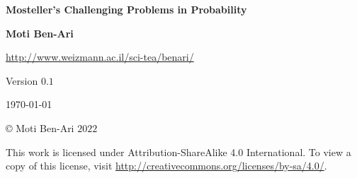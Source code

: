 

\thispagestyle{empty}

\begin{center}
\textbf{\LARGE Mosteller's Challenging Problems in Probability}

\bigskip
\bigskip
\bigskip

\textbf{\Large Moti Ben-Ari}

\bigskip

\url{http://www.weizmann.ac.il/sci-tea/benari/}

\bigskip
\bigskip

Version $0.1$

\bigskip

\today

\end{center}

\vfill

\begin{center}
\copyright{} Moti Ben-Ari $2022$
 \end{center}
 
\begin{small}
This work is licensed under Attribution-ShareAlike 4.0 International. To view a copy of this license, visit \url{http://creativecommons.org/licenses/by-sa/4.0/}.

%
%
%
%
%
%
\end{small}
\newpage

\tableofcontents

\newpage

